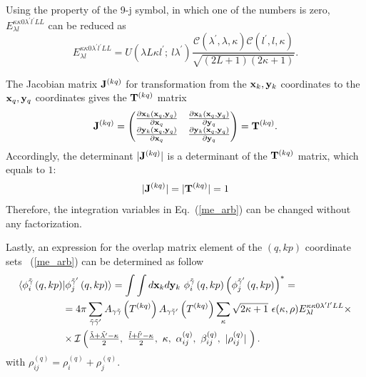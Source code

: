 \documentclass[12pt,a4paper,twoside]{article}
\begin{document}
Using the property of the 9-j symbol, in which one of the numbers is zero, ${E}^{\kappa \kappa 0 \lambda^{\prime} l^{\prime} L L}_{\lambda l}$ can be reduced as
\begin{equation}
{E}^{\kappa \kappa 0 \lambda^{\prime} l^{\prime} L L}_{\lambda l}
=U\left(  \lambda L \kappa l^{\prime};~ l \lambda^{\prime} \right) \frac{\mathcal{C} \left( \lambda^{\prime}, \lambda, \kappa \right) \mathcal{C} \left( l^{\prime}, l, \kappa \right) }{ \sqrt{\left( 2L+1 \right) \left( 2\kappa +1 \right)}}.
\end{equation}

The Jacobian  matrix ${\bf J}^{(kq)}$ for transformation from the ${\bf x}_k, {\bf y}_k$ coordinates to the ${\bf x}_q, {\bf y}_q$ coordinates gives the ${\bf T}^{(kq)}$ matrix
\begin{equation}
{\bf J}^{(kq)} = 
\begin{pmatrix}
\frac{\partial {\bf x}_k \left({\bf x}_q,{\bf y}_q \right)}{ \partial {\bf x}_q }  
& \frac{\partial {\bf x}_k \left({\bf x}_q,{\bf y}_q \right)}{ \partial {\bf y}_q } \\
\frac{\partial {\bf y}_k \left({\bf x}_q,{\bf y}_q \right)}{ \partial {\bf x}_q }  
& \frac{\partial {\bf y}_k \left({\bf x}_q,{\bf y}_q \right)}{ \partial {\bf y}_q } 
\end{pmatrix} = {\bf T}^{(kq)}.
\end{equation}
Accordingly, the determinant $\vert {\bf J}^{(kq)} \vert$ is a determinant of the ${\bf T}^{(kq)}$ matrix, which equals to $1$:
\begin{equation}
\vert {\bf J}^{(kq)} \vert = \vert {\bf T}^{(kq)} \vert =1
\end{equation}
  Therefore, the integration variables in Eq.~(\ref{me_arb}) can be changed without any factorization. 
  
  Lastly, an expression for the overlap matrix element of the $(q,kp)$ coordinate sets ~(\ref{me_arb}) can be determined as follow
\begin{align}
\langle \phi_{i}^{\tilde{\gamma}}\left(q,kp \right) & \vert 
\phi_{j}^{\tilde{\gamma}^{\prime}}\left(q,kp \right) \rangle =
\int \int d{\bf x}_k d{\bf y}_k  ~\phi_{i}^{\tilde{\gamma}}\left(q,kp \right) \left( \phi_{j}^{\tilde{\gamma}^{\prime}}\left(q,kp \right) \right)^{*}  = \nonumber 
\\ & = 4 \pi \sum_{\tilde{\gamma}\tilde{\gamma}^{\prime}}  A_{\gamma\tilde{\gamma}}\left( T^{(kq)} \right) A_{\gamma\tilde{\gamma}^{\prime}}\left( T^{(kq)} \right)
 \sum_{\kappa} \sqrt{2\kappa+1}~ \epsilon(\kappa, \rho) {E}^{\kappa \kappa 0 \lambda^{\prime} l^{\prime} L L}_{\lambda l} \times  \nonumber \\
 &\times \mathcal{I}\left(
 \tfrac{\tilde{\lambda}+\tilde{\lambda^{\prime}}-\kappa}{2}, ~
 \tfrac{\tilde{l}+\tilde{l^{\prime}}-\kappa}{2},~
 \kappa,~
 \alpha^{(q)}_{ij},~
 \beta^{(q)}_{ij} ,~
 \vert \rho^{(q)}_{ij} \vert ~
  \right).
\end{align}
with $\rho_{ij}^{(q)}=\rho_{i}^{(q)}+\rho_{j}^{(q)}$.
\end{document}

